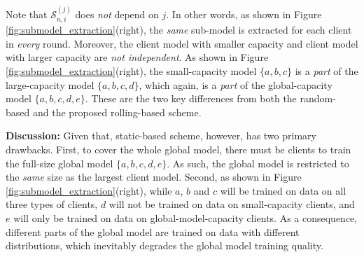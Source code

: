 \documentclass{article}
\begin{document}
Note that $\mathcal{S}^{(j)}_{n,i}$ does \textit{not} depend on $j$. In other words, as shown in Figure \ref{fig:submodel_extraction}(right), the \textit{same} sub-model is extracted for each client in \textit{every} round. 
%
Moreover, the client model with smaller capacity and client model with larger capacity are \textit{not independent}. As shown in Figure \ref{fig:submodel_extraction}(right), the small-capacity model $\{a, b, c\}$ is a \textit{part} of the large-capacity model $\{a, b, c, d\}$, which again, is a \textit{part} of the global-capacity model $\{a, b, c, d, e\}$.
%
These are the two key differences from both the random-based and the proposed rolling-based scheme.


\textbf{Discussion:} 
%
Given that, static-based scheme, however, has two primary drawbacks.
%
First, to cover the whole global model, there must be clients to train the full-size global model $\{a, b, c, d, e\}$. As such, the global model is restricted to the \textit{same} size as the largest client model. 
%
Second, as shown in Figure \ref{fig:submodel_extraction}(right), while $a$, $b$ and $c$ will be trained on data on all three types of clients, $d$ will not be trained on data on small-capacity clients, and $e$ will only be trained on data on global-model-capacity clients. As a consequence, different parts of the global model are trained on data with different distributions, which inevitably degrades the global model training quality. 

\end{document}
